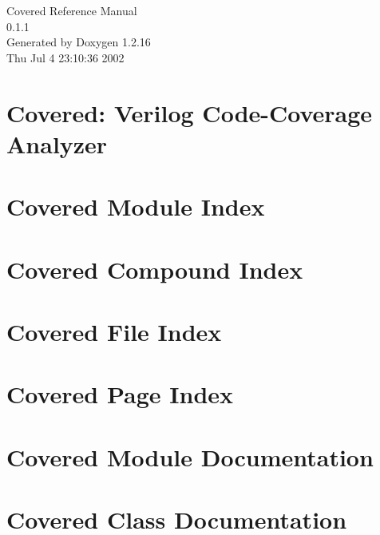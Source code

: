 \documentclass[a4paper]{book}
\begin{document}
\begin{titlepage}
\vspace*{7cm}
\begin{center}
{\Large Covered Reference Manual\\[1ex]\large 0.1.1}\\
\vspace*{1cm}
{\large Generated by Doxygen 1.2.16}\\
\vspace*{0.5cm}
{\small Thu Jul 4 23:10:36 2002}\\
\end{center}
\end{titlepage}
\clearemptydoublepage
{}
\tableofcontents
\clearemptydoublepage
{}
\chapter{Covered: Verilog Code-Coverage Analyzer}
\label{index}
\chapter{Covered Module Index}

\chapter{Covered Compound Index}

\chapter{Covered File Index}

\chapter{Covered Page Index}

\chapter{Covered Module Documentation}










\chapter{Covered Class Documentation}



























\end{document}
